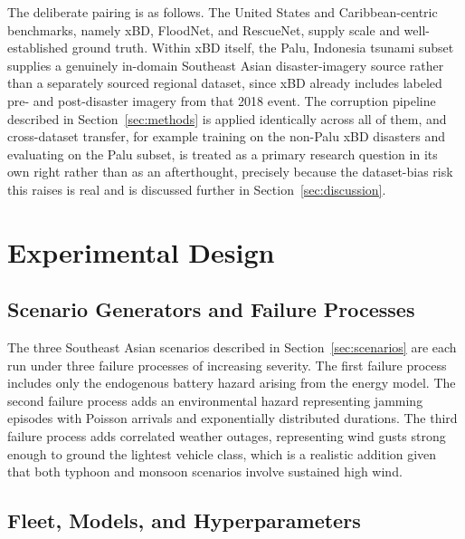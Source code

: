 \documentclass[drones,article,submit,moreauthors]{Definitions/mdpi}
\begin{document}
The deliberate pairing is as follows. The United States and Caribbean-centric benchmarks, namely xBD, FloodNet, and RescueNet, supply scale and well-established ground truth. Within xBD itself, the Palu, Indonesia tsunami subset supplies a genuinely in-domain Southeast Asian disaster-imagery source rather than a separately sourced regional dataset, since xBD already includes labeled pre- and post-disaster imagery from that 2018 event. The corruption pipeline described in Section~\ref{sec:methods} is applied identically across all of them, and cross-dataset transfer, for example training on the non-Palu xBD disasters and evaluating on the Palu subset, is treated as a primary research question in its own right rather than as an afterthought, precisely because the dataset-bias risk this raises is real and is discussed further in Section~\ref{sec:discussion}.

\section{Experimental Design}
\label{sec:experiments}

\subsection{Scenario Generators and Failure Processes}

The three Southeast Asian scenarios described in Section~\ref{sec:scenarios} are each run under three failure processes of increasing severity. The first failure process includes only the endogenous battery hazard arising from the energy model. The second failure process adds an environmental hazard representing jamming episodes with Poisson arrivals and exponentially distributed durations. The third failure process adds correlated weather outages, representing wind gusts strong enough to ground the lightest vehicle class, which is a realistic addition given that both typhoon and monsoon scenarios involve sustained high wind.

\subsection{Fleet, Models, and Hyperparameters}
\end{document}
